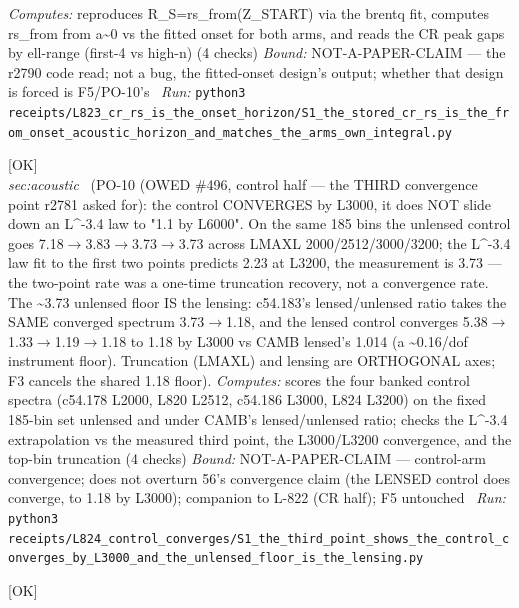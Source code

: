 \begin{description}
\emph{Computes:} reproduces R\_S=rs\_from(Z\_START) via the brentq fit, computes rs\_from from a\textasciitilde{}0 vs the fitted onset for both arms, and reads the CR peak gaps by ell-range (first-4 vs high-n) (4 checks)
 \emph{Bound:} NOT-A-PAPER-CLAIM --- the r2790 code read; not a bug, the fitted-onset design's output; whether that design is forced is F5/PO-10's
\ \emph{Run:} \texttt{python3 receipts/L823\_cr\_rs\_is\_the\_onset\_horizon/S1\_the\_stored\_cr\_rs\_is\_the\_from\_onset\_acoustic\_horizon\_and\_matches\_the\_arms\_own\_integral.py}
\item[\label{rcpt:S1_the_third_point_shows_the_control_converges_by_L3000_and_the_unlensed_floor_is_the_lensing}\textbf{}\quad\texttt{S1\_the\_third\_point\_shows\_the\_control\_converges\_by\_L3000\_and\_the\_unlensed\_floor\_is\_the\_lensing}]\hfill\textsf{[OK]}\\
\textit{sec:acoustic} \ (PO-10 (OWED \#496, control half --- the THIRD convergence point r2781 asked for): the control CONVERGES by L3000, it does NOT slide down an L\textasciicircum{}-3.4 law to "1.1 by L6000". On the same 185 bins the unlensed control goes 7.18\ensuremath{\to}3.83\ensuremath{\to}3.73\ensuremath{\to}3.73 across LMAXL 2000/2512/3000/3200; the L\textasciicircum{}-3.4 law fit to the first two points predicts 2.23 at L3200, the measurement is 3.73 --- the two-point rate was a one-time truncation recovery, not a convergence rate. The \textasciitilde{}3.73 unlensed floor IS the lensing: c54.183's lensed/unlensed ratio takes the SAME converged spectrum 3.73\ensuremath{\to}1.18, and the lensed control converges 5.38\ensuremath{\to}1.33\ensuremath{\to}1.19\ensuremath{\to}1.18 to 1.18 by L3000 vs CAMB lensed's 1.014 (a \textasciitilde{}0.16/dof instrument floor). Truncation (LMAXL) and lensing are ORTHOGONAL axes; F3 cancels the shared 1.18 floor). 
\emph{Computes:} scores the four banked control spectra (c54.178 L2000, L820 L2512, c54.186 L3000, L824 L3200) on the fixed 185-bin set unlensed and under CAMB's lensed/unlensed ratio; checks the L\textasciicircum{}-3.4 extrapolation vs the measured third point, the L3000/L3200 convergence, and the top-bin truncation (4 checks)
 \emph{Bound:} NOT-A-PAPER-CLAIM --- control-arm convergence; does not overturn 56's convergence claim (the LENSED control does converge, to 1.18 by L3000); companion to L-822 (CR half); F5 untouched
\ \emph{Run:} \texttt{python3 receipts/L824\_control\_converges/S1\_the\_third\_point\_shows\_the\_control\_converges\_by\_L3000\_and\_the\_unlensed\_floor\_is\_the\_lensing.py}
\item[\label{rcpt:S1_the_converged_controls_remainder_is_a_broadband_instrument_floor_not_a_localized_defect}\textbf{}\quad\texttt{S1\_the\_converged\_controls\_remainder\_is\_a\_broadband\_instrument\_floor\_not\_a\_localized\_defect}]\hfill\textsf{[OK]}\\

\end{description}
